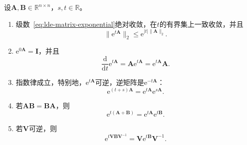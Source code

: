 \begin{theorem}[矩阵指数的基本性质]
\label{thm:lde-matexp-properties}
设$\bm{A},\bm{B}\in\mathbb{R}^{n\times n}$，$s,t\in\mathbb{R}$。
\begin{enumerate}
 \item 级数~\eqref{eq:lde-matrix-exponential}绝对收敛，在$t$的有界集上一致收敛，并且
 \begin{equation}
  \lVert\mathrm{e}^{t\bm{A}}\rVert_2\leq\mathrm{e}^{\lvert t\rvert\lVert\bm{A}\rVert_2}.
  \label{eq:lde-matexp-bound}
 \end{equation}
 \item $\mathrm{e}^{0\bm{A}}=\bm{I}$，并且
 \begin{equation}
  \frac{\mathrm{d}}{\mathrm{d}t}\mathrm{e}^{t\bm{A}}=\bm{A}\mathrm{e}^{t\bm{A}}=\mathrm{e}^{t\bm{A}}\bm{A}.
  \label{eq:lde-matexp-derivative}
 \end{equation}
 \item 指数律成立，特别地，$\mathrm{e}^{t\bm{A}}$可逆，逆矩阵是$\mathrm{e}^{-t\bm{A}}$：
 \begin{equation}
  \mathrm{e}^{(t+s)\bm{A}}=\mathrm{e}^{t\bm{A}}\mathrm{e}^{s\bm{A}}.
  \label{eq:lde-matexp-group}
 \end{equation}
 \item 若$\bm{A}\bm{B}=\bm{B}\bm{A}$，则
 \begin{equation}
  \mathrm{e}^{t(\bm{A}+\bm{B})}=\mathrm{e}^{t\bm{A}}\mathrm{e}^{t\bm{B}}.
  \label{eq:lde-matexp-commuting}
 \end{equation}
 \item 若$\bm{V}$可逆，则
 \begin{equation}
  \mathrm{e}^{t\bm{V}\bm{B}\bm{V}^{-1}}=\bm{V}\mathrm{e}^{t\bm{B}}\bm{V}^{-1}.
  \label{eq:lde-matexp-similarity}
 \end{equation}
\end{enumerate}
\end{theorem}

